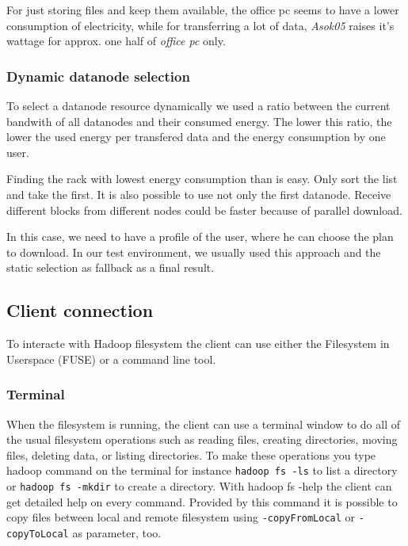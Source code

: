 For just storing files and keep them available, the office pc seems to have a lower consumption of electricity, while for transferring a lot of data, \textit{Asok05} raises it's wattage for approx. one half of \textit{office pc} only.

\subsubsection{Dynamic datanode selection}

To select a datanode resource dynamically we used a ratio between the current bandwith of all datanodes and their consumed energy. The lower this ratio, the lower the used energy per transfered data and the energy consumption by one user.

Finding the rack with lowest energy consumption than is easy. Only sort the list and take the first. It is also possible to use not only the first datanode. Receive different blocks from different nodes could be faster because of parallel download.

In this case, we need to have a profile of the user, where he can choose the plan to download. In our test environment, we usually used this approach and the static selection as fallback as a final result.

\subsection{Client connection}
\label{sec:hdfs_client}

To interacte with Hadoop filesystem the client can use either the Filesystem in Userspace (FUSE) or a command line tool.

\subsubsection{Terminal}

When the filesystem is running, the client can use a terminal window to do all of the usual filesystem operations such as reading files, creating directories, moving files, deleting data, or listing directories. 
To make these operations you type hadoop command on the terminal for instance \texttt{hadoop fs -ls} to list a directory or \texttt{hadoop fs -mkdir} to create a directory. 
With hadoop fs -help the client can get detailed help on every command. 
Provided by this command it is possible to copy files between local and remote filesystem using \texttt{-copyFromLocal} or \texttt{-copyToLocal} as parameter, too.

